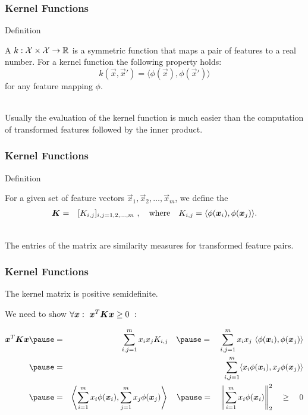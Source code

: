 \begin{frame}
	\frametitle{Kernel Functions}

	\begin{citeblock}{Definition}

		A  $k: {\cal X} \times {\cal X}\rightarrow \mathbb{R}$ is a symmetric function that maps a pair of features to a real number. For a kernel function the following property holds:
		\begin{displaymath}
			k(\vec x, \vec x') = \langle\phi(\vec x), \phi(\vec x')\rangle
		\end{displaymath}
		for any feature mapping $\phi$.
	\end{citeblock}
	\pspread

	 \\[.2cm]

	Usually the evaluation of the kernel function is much easier than the computation of transformed features followed by the inner product.
\end{frame}


\begin{frame}
	\frametitle{Kernel Functions \cont}

	\begin{citeblock}{Definition}

		For a given set of feature vectors $\vec x_1, \vec x_2, \dots, \vec x_m$, we define the \\
		\begin{eqnarray*}
			{\bm K} &=& [K_{i,j}]_{i,j=1,2,\dots,m}~, \quad \mbox{where} \quad K_{i,j} = \langle\phi({\bm x}_i), \phi({\bm x}_j)\rangle.
		\end{eqnarray*}
	\end{citeblock}
	\pspread

	 \\[.2cm]
	The entries of the matrix are similarity measures for transformed feature pairs.
\end{frame}


\begin{frame}
	\frametitle{Kernel Functions \cont}

	\begin{lemma}
		The kernel matrix is positive semidefinite.
	\end{lemma}
	\pause

	\vspace{.3cm}
	 We need to show $\forall {\bm x}:~{\bm x}^T {\bm K} {\bm x} \geq 0$~: \pause

	\small
	\begin{eqnarray*}
		\vec x^T \mat K \vec x  \pause
		&=& \sum_{i,j=1}^m x_ix_j K_{i,j} \quad \pause
		=  \quad \sum_{i,j=1}^m x_ix_j\ \langle\phi(\vec x_i), \phi(\vec x_j)\rangle \\ \pause
		&=& \sum_{i,j=1}^m  \langle x_i\phi(\vec x_i), x_j\phi(\vec x_j)\rangle \\ \pause
		&=& \left \langle \sum_{i=1}^m x_i\phi(\vec x_i), \sum_{j=1}^mx_j\phi(\vec x_j)\right\rangle \quad \pause
		=  \quad \left\|\sum_{i=1}^m x_i\phi(\vec x_i)\right\|_2^2 \quad
		\geq \quad 0
	\end{eqnarray*}
\end{frame}


